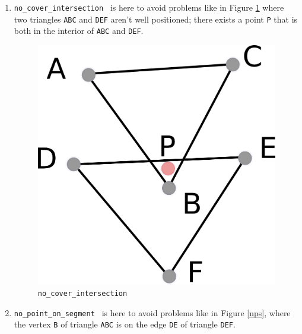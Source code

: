 \documentclass[a4paper,10pt]{article}
\def\ttt#1#2{{\tt{\color{black}#1} #2}}
\begin{document}
\begin{enumerate}
\item \ttt{no\_cover\_intersection}{} is here to avoid problems like in Figure \ref{nci} where two triangles {\tt ABC} and {\tt DEF} aren't well positioned; there exists a point {\tt P} that is both in the interior of {\tt ABC} and {\tt DEF}.
\begin{figure}
\centering
\includegraphics[scale=2]{nci}
\caption{\label{nci} {\tt no\_cover\_intersection}}
\end{figure}
\item \ttt{no\_point\_on\_segment}{} is here to avoid problems like in Figure \ref{nps}, where the vertex {\tt B} of triangle {\tt ABC} is on the edge {\tt DE} of triangle {\tt DEF}.


\end{enumerate}
\end{document}
